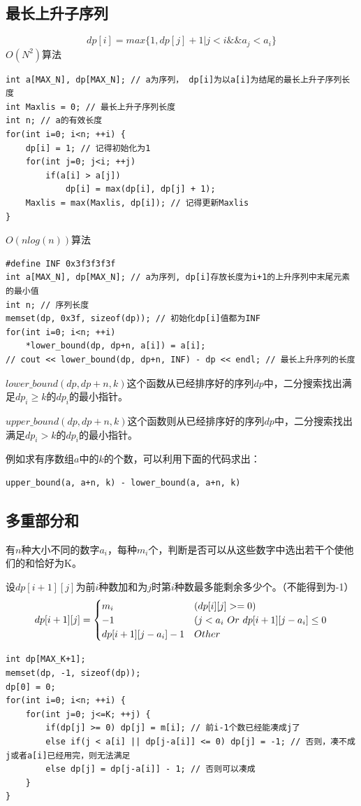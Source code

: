 \documentclass[a4paper]{ctexrep}
\begin{document}
\subsection{最长上升子序列}
$$dp[i]=max\{1, dp[j]+1 | j<i \&\& a_j<a_i\}$$
$O(N^2)$算法

\begin{lstlisting}
int a[MAX_N], dp[MAX_N]; // a为序列， dp[i]为以a[i]为结尾的最长上升子序列长度
int Maxlis = 0; // 最长上升子序列长度
int n; // a的有效长度
for(int i=0; i<n; ++i) {
	dp[i] = 1; // 记得初始化为1
	for(int j=0; j<i; ++j)
		if(a[i] > a[j])
			dp[i] = max(dp[i], dp[j] + 1);
	Maxlis = max(Maxlis, dp[i]); // 记得更新Maxlis
}
\end{lstlisting}
$O(n log(n))$算法

\begin{lstlisting}
#define INF 0x3f3f3f3f
int a[MAX_N], dp[MAX_N]; // a为序列, dp[i]存放长度为i+1的上升序列中末尾元素的最小值
int n; // 序列长度
memset(dp, 0x3f, sizeof(dp)); // 初始化dp[i]值都为INF
for(int i=0; i<n; ++i)
	*lower_bound(dp, dp+n, a[i]) = a[i];
// cout << lower_bound(dp, dp+n, INF) - dp << endl; // 最长上升序列的长度
\end{lstlisting}

$lower\_bound(dp, dp+n, k)$这个函数从已经排序好的序列$dp$中，二分搜索找出满足$dp_i \ge k$的$dp_i$的最小指针。

$upper\_bound(dp, dp+n, k)$这个函数则从已经排序好的序列$dp$中，二分搜索找出满足$dp_i > k$的$dp_i$的最小指针。

例如求有序数组$a$中的$k$的个数，可以利用下面的代码求出：
\begin{lstlisting}
upper_bound(a, a+n, k) - lower_bound(a, a+n, k)
\end{lstlisting}

\subsection{多重部分和}
有$n$种大小不同的数字$a_i$，每种$m_i$个，判断是否可以从这些数字中选出若干个使他们的和恰好为K。

设$dp[i+1][j]$为前$i$种数加和为$j$时第$i$种数最多能剩余多少个。（不能得到为-1）
$$dp[i+1][j] = \begin{cases}
m_i & (dp[i][j] >= 0) \cr
-1 & (j < a_i \ Or\  dp[i+1][j-a_i] \leq 0 \cr
dp[i+1][j-a_i] - 1 & Other
\end{cases}
$$
\begin{lstlisting}
int dp[MAX_K+1];
memset(dp, -1, sizeof(dp));
dp[0] = 0;
for(int i=0; i<n; ++i) {
	for(int j=0; j<=K; ++j) {
		if(dp[j] >= 0) dp[j] = m[i]; // 前i-1个数已经能凑成j了
		else if(j < a[i] || dp[j-a[i]] <= 0) dp[j] = -1; // 否则，凑不成j或者a[i]已经用完，则无法满足
		else dp[j] = dp[j-a[i]] - 1; // 否则可以凑成
	}
}
\end{lstlisting}
\end{document}
